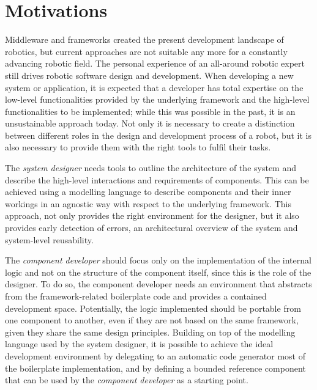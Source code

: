 \section{Motivations}
Middleware and frameworks created the present development landscape of robotics, but current approaches are not suitable any more for a constantly advancing robotic field. The personal experience of an all-around robotic expert still drives robotic software design and development. When developing a new system or application, it is expected that a developer has total expertise on the low-level functionalities provided by the underlying framework and the high-level functionalities to be implemented; while this was possible in the past, it is an unsustainable approach today. Not only it is necessary to create a distinction between different roles in the design and development process of a robot, but it is also necessary to provide them with the right tools to fulfil their tasks.

The \textit{system designer} needs tools to outline the architecture of the system and describe the high-level interactions and requirements of components. This can be achieved using a modelling language to describe components and their inner workings in an agnostic way with respect to the underlying framework. This approach, not only provides the right environment for the designer, but it also provides early detection of errors, an architectural overview of the system and system-level reusability. 

The \textit{component developer} should focus only on the implementation of the internal logic and not on the structure of the component itself, since this is the role of the designer. To do so, the component developer needs an environment that abstracts from the framework-related boilerplate code and provides a contained development space. Potentially, the logic implemented should be portable from one component to another, even if they are not based on the same framework, given they share the same design principles. Building on top of the modelling language used by the system designer, it is possible to achieve the ideal development environment by delegating to an automatic code generator most of the boilerplate implementation, and by defining a bounded reference component that can be used by the \textit{component developer} as a starting point.

